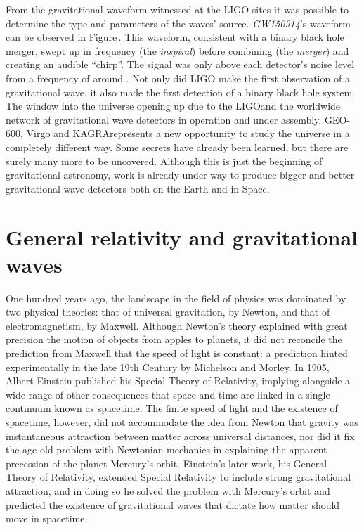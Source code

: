 From the gravitational waveform witnessed at the LIGO sites it was possible to determine the type and parameters of the waves' source. \emph{GW150914}'s waveform can be observed in Figure\,. This waveform, consistent with a binary black hole merger, swept up in frequency (the \emph{inspiral}) before combining (the \emph{merger}) and creating an audible ``chirp''. The signal was only above each detector's noise level from a frequency of around . Not only did LIGO make the first observation of a gravitational wave, it also made the first detection of a binary black hole system. The window into the universe opening up due to the LIGO\textemdash and the worldwide network of gravitational wave detectors in operation and under assembly, GEO-600, Virgo and KAGRA\textemdash represents a new opportunity to study the universe in a completely different way. Some secrets have already been learned, but there are surely many more to be uncovered. Although this is just the beginning of gravitational astronomy, work is already under way to produce bigger and better gravitational wave detectors both on the Earth and in Space.

\section{General relativity and gravitational waves}

One hundred years ago, the landscape in the field of physics was dominated by two physical theories: that of universal gravitation, by Newton, and that of electromagnetism, by Maxwell. Although Newton's theory explained with great precision the motion of objects from apples to planets, it did not reconcile the prediction from Maxwell that the speed of light is constant: a prediction hinted experimentally in the late 19th Century by Michelson and Morley. In 1905, Albert Einstein published his Special Theory of Relativity, implying alongside a wide range of other consequences that space and time are linked in a single continuum known as spacetime. The finite speed of light and the existence of spacetime, however, did not accommodate the idea from Newton that gravity was instantaneous attraction between matter across universal distances, nor did it fix the age-old problem with Newtonian mechanics in explaining the apparent precession of the planet Mercury's orbit. Einstein's later work, his General Theory of Relativity, extended Special Relativity to include strong gravitational attraction, and in doing so he solved the problem with Mercury's orbit and predicted the existence of gravitational waves that dictate how matter should move in spacetime.

